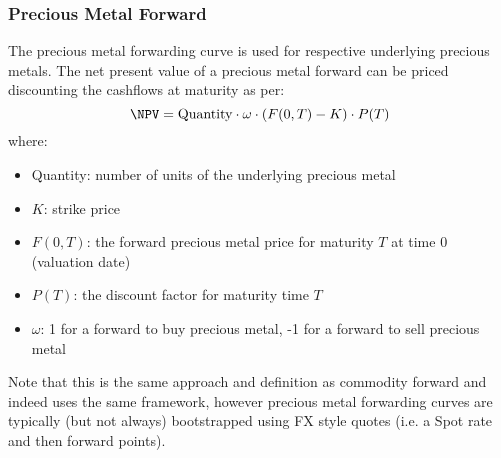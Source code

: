 \subsubsection{Precious Metal Forward}
\label{pricing:com_pm_forward}

The precious metal forwarding curve is used for respective underlying precious metals.
The net present value of a precious metal forward can be priced discounting the 
cashflows at maturity as per:
$$
\NPV = \mbox{Quantity}\cdot \omega\cdot (F(0,T) - K) \cdot P(T)
$$
where:
\begin{itemize}
\item Quantity: number of units of the underlying precious metal
\item $K$: strike price
\item $F(0,T)$: the forward precious metal price for maturity $T$ at time 0 (valuation date)
\item $P(T)$: the discount factor for maturity time $T$
\item $\omega$: 1 for a forward to buy precious metal, -1 for a forward to sell precious metal
\end{itemize}

Note that this is the same approach and definition as commodity forward and indeed uses the same framework, however precious metal forwarding curves are typically (but not always) bootstrapped using FX style quotes (i.e. a Spot rate and then forward points).
